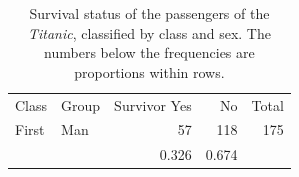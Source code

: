 \documentclass[11pt,a4paper,openany]{book}
\begin{document}
\begin{longtable}[]{@{}llrrr@{}}
\caption{\label{tab:t-titanic3} Survival status of the passengers of the
\emph{Titanic}, classified by class and sex. The numbers below the
frequencies are proportions within rows.}\tabularnewline
\toprule
\begin{minipage}[t]{0.30\columnwidth}\raggedright\strut
Class\strut
\end{minipage} & \begin{minipage}[t]{0.14\columnwidth}\raggedright\strut
Group\strut
\end{minipage} & \begin{minipage}[t]{0.27\columnwidth}\raggedleft\strut
Survivor Yes\strut
\end{minipage} & \begin{minipage}[t]{0.07\columnwidth}\raggedleft\strut
No\strut
\end{minipage} & \begin{minipage}[t]{0.07\columnwidth}\raggedleft\strut
Total\strut
\end{minipage}\tabularnewline
\begin{minipage}[t]{0.30\columnwidth}\raggedright\strut
First\strut
\end{minipage} & \begin{minipage}[t]{0.14\columnwidth}\raggedright\strut
Man\strut
\end{minipage} & \begin{minipage}[t]{0.27\columnwidth}\raggedleft\strut
57\strut
\end{minipage} & \begin{minipage}[t]{0.07\columnwidth}\raggedleft\strut
118\strut
\end{minipage} & \begin{minipage}[t]{0.07\columnwidth}\raggedleft\strut
175\strut
\end{minipage}\tabularnewline
\begin{minipage}[t]{0.30\columnwidth}\raggedright\strut
\strut
\end{minipage} & \begin{minipage}[t]{0.14\columnwidth}\raggedright\strut
\strut
\end{minipage} & \begin{minipage}[t]{0.27\columnwidth}\raggedleft\strut
0.326\strut
\end{minipage} & \begin{minipage}[t]{0.07\columnwidth}\raggedleft\strut
0.674\strut
\end{minipage} & \begin{minipage}[t]{0.07\columnwidth}\raggedleft\strut

\end{minipage}
\end{longtable}
\end{document}

